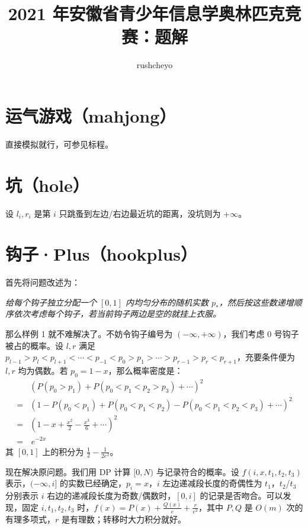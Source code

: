 \documentclass[12pt,a4paper,oneside]{article}
\begin{document}
\title{\bf 2021 年安徽省青少年信息学奥林匹克竞赛：题解}
\author{rushcheyo}
\maketitle

\section{运气游戏（mahjong）}

直接模拟就行，可参见标程。

\section{坑（hole）}

设 $l_i,r_i$ 是第 $i$ 只跳蚤到左边/右边最近坑的距离，没坑则为 $+\infty$。



\section{钩子·Plus（hookplus）}

首先将问题改述为：

{\it 给每个钩子独立分配一个 $[0,1]$ 内均匀分布的随机实数 $p_{\ast}$，然后按这些数递增顺序依次考虑每个钩子，若当前钩子两边是空的就挂上衣服。}

那么样例 1 就不难解决了。不妨令钩子编号为 $(-\infty,+\infty)$，我们考虑 $0$ 号钩子被占的概率。设 $l,r$ 满足 $p_{l-1}>p_l<p_{l+1}<\cdots<p_{-1}<p_0>p_1>\cdots>p_{r-1}>p_r<p_{r+1}$，充要条件便为 $l,r$ 均为偶数。若 $p_0=1-x$，那么概率密度是：
  \begin{align*}
     &\left(P(p_0>p_1)+P(p_0<p_1<p_2>p_3)+\cdots\right)^2\\
    =&\left(1-P(p_0<p_1)+P(p_0<p_1<p_2)-P(p_0<p_1<p_2<p_3)+\cdots\right)^2\\
    =&\left(1-x+\frac{x^2}{2}-\frac{x^3}{6}+\cdots\right)^2\\
    =&\,e^{-2x}
  \end{align*}
  其 $[0,1]$ 上的积分为 $\frac{1}{2}-\frac{1}{2e^2}$。

现在解决原问题。我们用 DP 计算 $[0,N)$ 与记录符合的概率。设 $f(i,x,t_1,t_2,t_3)$ 表示，$(-\infty,i]$ 的实数已经确定，$p_i=x$，$i$ 左边递减段长度的奇偶性为 $t_1$，$t_2$/$t_3$ 分别表示 $i$ 右边的递减段长度为奇数/偶数时，$[0,i]$ 的记录是否吻合。可以发现，固定 $i,t_1,t_2,t_3$ 时，$f(x)=P(x)+\frac{Q(x)}{e}+\frac{r}{e^2}$，其中 $P,Q$ 是 $O(m)$ 次的有理多项式，$r$ 是有理数；转移时大力积分就好。
\end{document}
